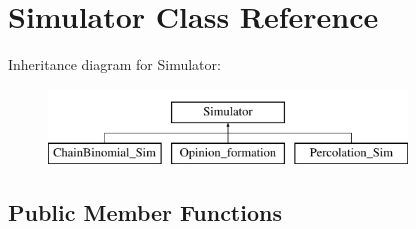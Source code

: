 \hypertarget{classSimulator}{}\section{Simulator Class Reference}
\label{classSimulator}
Inheritance diagram for Simulator\+:\begin{figure}[H]
\begin{center}
\leavevmode
\includegraphics[height=2.000000cm]{classSimulator}
\end{center}
\end{figure}
\subsection*{Public Member Functions}
